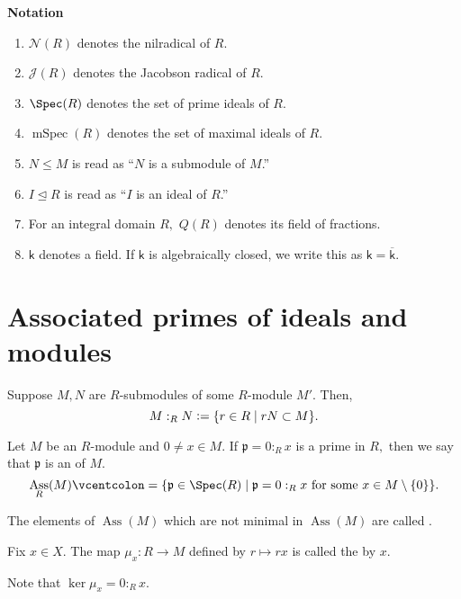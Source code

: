 \documentclass[12pt]{article}	%
\DeclareMathOperator{\Ass}{Ass}
\DeclareMathOperator{\mSpec}{mSpec}
\begin{document}


\coverpage

\updated{\today}

\thispagestyle{empty}
\tableofcontents
\newpage
\pagestyle{fancy}
\setcounter{page}{1}

\textbf{Notation}
\begin{enumerate}
	\item $\mathcal{N}(R)$ denotes the nilradical of $R.$
	\item $\mathcal{J}(R)$ denotes the Jacobson radical of $R.$
	\item $\Spec(R)$ denotes the set of prime ideals of $R.$
	\item $\mSpec(R)$ denotes the set of maximal ideals of $R.$
	\item $N \le M$ is read as ``$N$ is a submodule of $M$.''
	\item $I \unlhd R$ is read as ``$I$ is an ideal of $R$.''
	\item For an integral domain $R,$ $Q(R)$ denotes its field of fractions.
	\item $\mathsf{k}$ denotes a field. If $\mathsf{k}$ is algebraically closed, we write this as $\mathsf{k} = \overline{\mathsf{k}}.$ 
\end{enumerate}

\section{Associated primes of ideals and modules} %
\begin{defn}%
	Suppose $M, N$ are $R$-submodules of some $R$-module $M'.$ Then,
	\begin{equation*} 
		M:_RN \vcentcolon= \{r \in R \mid rN \subset M\}.
	\end{equation*}
\end{defn}
\begin{defn}%
	Let $M$ be an $R$-module and $0 \neq x \in M.$ If $\mathfrak{p} = 0:_Rx$ is a prime in $R,$ then we say that $\mathfrak{p}$ is an  of $M.$
	\begin{equation*} 
		\Ass_R(M) \vcentcolon= \{\mathfrak{p} \in \Spec(R) \mid \mathfrak{p} = 0 :_R x \text{ for some } x \in M \setminus \{0\}\}.
	\end{equation*}
\end{defn}
\begin{defn}%
	The elements of $\Ass(M)$ which are not minimal in $\Ass(M)$ are called .
\end{defn}
\begin{defn}%
	Fix $x \in X.$ The map $\mu_x : R \to M$ defined by $r \mapsto rx$ is called the  by $x.$
\end{defn}
Note that $\ker \mu_x = 0:_Rx.$
\end{document}
